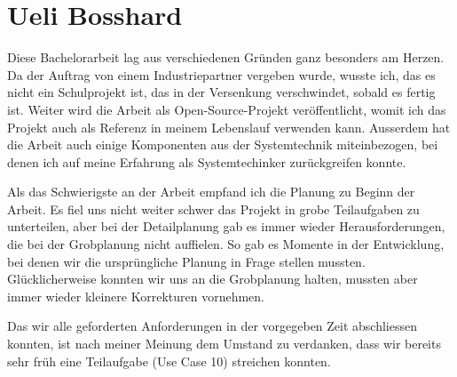 \section*{Ueli Bosshard}

Diese Bachelorarbeit lag aus verschiedenen Gründen ganz besonders am Herzen. Da der Auftrag von einem Industriepartner vergeben wurde, wusste ich, das es nicht ein Schulprojekt ist, das in der Versenkung verschwindet, sobald es fertig ist. Weiter wird die Arbeit als Open-Source-Projekt veröffentlicht, womit ich das Projekt auch als Referenz in meinem Lebenslauf verwenden kann. Ausserdem hat die Arbeit auch einige Komponenten aus der Systemtechnik miteinbezogen, bei denen ich auf meine Erfahrung als Systemtechinker zurückgreifen konnte. 

Als das Schwierigste an der Arbeit empfand ich die Planung zu Beginn der Arbeit. Es fiel uns nicht weiter schwer das Projekt in grobe Teilaufgaben zu unterteilen, aber bei der Detailplanung gab es immer wieder Herausforderungen, die bei der Grobplanung nicht auffielen. So gab es Momente in der Entwicklung, bei denen wir die ursprüngliche Planung in Frage stellen mussten. Glücklicherweise konnten wir uns an die Grobplanung halten, mussten aber immer wieder kleinere Korrekturen vornehmen.

Das wir alle geforderten Anforderungen in der vorgegeben Zeit abschliessen konnten, ist nach meiner Meinung dem Umstand zu verdanken, dass wir bereits sehr früh eine Teilaufgabe (Use Case 10) streichen konnten.